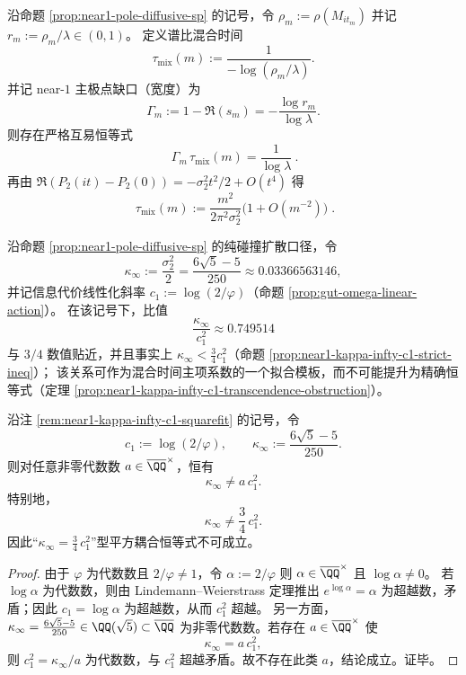 \begin{corollary}\label{cor:near1-pole-taumix-m2}
沿命题 \ref{prop:near1-pole-diffusive-sp} 的记号，令 \(\rho_m:=\rho(M_{it_m})\) 并记 \(r_m:=\rho_m/\lambda\in(0,1)\)。
定义谱比混合时间
\[
\tau_{\mathrm{mix}}(m):=\frac{1}{-\log(\rho_m/\lambda)}.
\]
并记 near-\(1\) 主极点缺口（宽度）为
\[
\Gamma_m:=1-\Re(s_m)=-\frac{\log r_m}{\log\lambda}.
\]
则存在严格互易恒等式
\[
\boxed{\ \Gamma_m\,\tau_{\mathrm{mix}}(m)=\frac{1}{\log\lambda}\ }.
\]
再由 \(\Re(P_2(it)-P_2(0))=-\sigma_2^2 t^2/2+O(t^4)\) 得
\[
\boxed{\;
\tau_{\mathrm{mix}}(m)
:=\frac{m^2}{2\pi^2\sigma_2^2}\bigl(1+O(m^{-2})\bigr)\; }.
\]
\end{corollary}

\begin{remark}[远距常数的平方拟合：信息代价斜率 \texorpdfstring{$c_1=\log(2/\varphi)$}{c1=log(2/phi)} 与扩散常数 \texorpdfstring{$\kappa_\infty$}{kappa_infty}]\label{rem:near1-kappa-infty-c1-squarefit}
沿命题 \ref{prop:near1-pole-diffusive-sp} 的纯碰撞扩散口径，令
\[
\kappa_\infty:=\frac{\sigma_2^2}{2}=\frac{6\sqrt5-5}{250}\approx 0.03366563146,
\]
并记信息代价线性化斜率 \(c_1:=\log(2/\varphi)\)（命题 \ref{prop:gut-omega-linear-action}）。
在该记号下，比值
\[
\frac{\kappa_\infty}{c_1^2}\approx 0.749514
\]
与 \(3/4\) 数值贴近，并且事实上 \(\kappa_\infty<\tfrac34 c_1^2\)（命题 \ref{prop:near1-kappa-infty-c1-strict-ineq}）；
该关系可作为混合时间主项系数的一个拟合模板，而不可能提升为精确恒等式（定理 \ref{prop:near1-kappa-infty-c1-transcendence-obstruction}）。
\end{remark}

\begin{theorem}\label{prop:near1-kappa-infty-c1-transcendence-obstruction}
沿注 \ref{rem:near1-kappa-infty-c1-squarefit} 的记号，令
\[
c_1:=\log(2/\varphi),\qquad
\kappa_\infty:=\frac{6\sqrt5-5}{250}.
\]
则对任意非零代数数 \(a\in\overline{\QQ}^{\times}\)，恒有
\[
\kappa_\infty\neq a\,c_1^2.
\]
特别地，
\[
\kappa_\infty\neq \frac34\,c_1^2.
\]
因此“\(\kappa_\infty=\frac34\,c_1^2\)”型平方耦合恒等式不可成立。
\end{theorem}
\begin{proof}
由于 \(\varphi\) 为代数数且 \(2/\varphi\neq 1\)，令 \(\alpha:=2/\varphi\) 则 \(\alpha\in\overline{\QQ}^\times\) 且 \(\log\alpha\neq 0\)。
若 \(\log\alpha\) 为代数数，则由 Lindemann--Weierstrass 定理推出 \(e^{\log\alpha}=\alpha\) 为超越数，矛盾；因此 \(c_1=\log\alpha\) 为超越数，从而 \(c_1^2\) 超越。
另一方面，\(\kappa_\infty=\frac{6\sqrt5-5}{250}\in\QQ(\sqrt5)\subset\overline{\QQ}\) 为非零代数数。若存在 \(a\in\overline{\QQ}^{\times}\) 使
\[
\kappa_\infty=a\,c_1^2,
\]
则 \(c_1^2=\kappa_\infty/a\) 为代数数，与 \(c_1^2\) 超越矛盾。故不存在此类 \(a\)，结论成立。证毕。\cite{Baker1975TranscendentalNumberTheory}
\end{proof}

